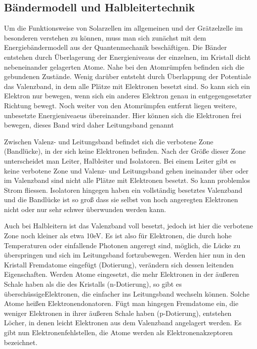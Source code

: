 \documentclass[11pt]{scrartcl}
\begin{document}
\subsection{B\"andermodell und Halbleitertechnik}
Um die Funktionsweise von Solarzellen im allgemeinen und der Gr\"atzelzelle im besonderen verstehen zu k\"onnen, muss man sich zun\"achst mit dem Energieb\"andermodell aus der Quantenmechanik besch\"aftigen. Die B\"ander entstehen durch \"Uberlagerung der Energieniveaus der einzelnen, im Kristall dicht nebeneinander gelagerten Atome. Nahe bei den Atomr\"umpfen befinden sich die gebundenen Zust\"ande. Wenig dar\"uber entsteht durch \"Uberlappung der Potentiale das Valenzband, in dem alle Pl\"atze mit Elektronen besetzt sind. So kann sich ein Elektron nur bewegen, wenn sich ein anderes Elektron genau in entgegengesetzter Richtung bewegt. 
Noch weiter von den Atomr\"umpfen entfernt liegen weitere, unbesetzte Energieniveaeus \"ubereinander. Hier k\"onnen sich die Elektronen frei bewegen, dieses Band wird daher Leitungsband genannt

Zwischen Valenz- und Leitungsband befindet sich die verbotene Zone (Bandl\"ucke), in der sich keine Elektronen befinden. Nach der Gr\"o\ss{}e dieser Zone unterscheidet man Leiter, Halbleiter und Isolatoren. Bei einem Leiter gibt es keine verbotene Zone und Valenz- und Leitungsband gehen ineinander \"uber oder im Valenzband sind nicht alle Pl\"atze mit Elektronen besetzt. So kann problemlos Strom fliessen. Isolatoren hingegen haben ein vollst\"andig besetztes Valenzband und die Bandl\"ucke ist so gro\ss{} dass sie selbst von hoch angeregten Elektronen nicht oder nur sehr schwer \"uberwunden werden kann.

Auch bei Halbleitern ist das Valenzband voll besetzt, jedoch ist hier die verbotene Zone noch kleiner als etwa 10eV. Es ist also f\"ur Elektronen, die durch hohe Temperaturen oder einfallende Photonen angeregt sind, m\"oglich, die L\"ucke zu \"uberspringen und sich im Leitungsband fortzubewegen. Werden hier nun in den Kristall Fremdatome eingef\"ugt (Dotierung), ver\"andern sich dessen leitenden Eigenschaften. Werden Atome eingesetzt, die mehr Elektronen in der \"au\ss{}eren Schale haben als die des Kristalls (n-Dotierung), so gibt es \glqq\"ubersch\"ussige\grqq Elektronen, die einfacher ins Leitungsband wechseln k\"onnen. Solche Atome hei\ss{}en Elektronendonatoren. F\"ugt man hingegen Fremdatome ein, die weniger Elektronen in ihrer \"au\ss{}eren Schale haben (p-Dotierung), entstehen L\"ocher, in denen leicht Elektronen aus dem Valenzband angelagert werden. Es gibt nun Elektronenfehlstellen, die Atome werden als Elektronenakzeptoren bezeichnet.
\end{document}
